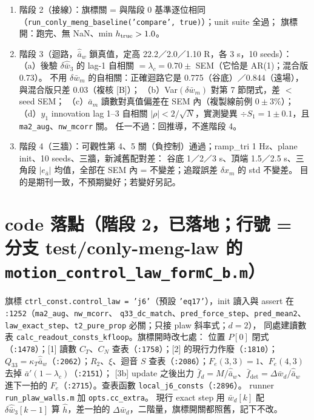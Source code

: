 \documentclass[11pt,a4paper]{ctexart}
\newcommand{\ba}{\bar{a}}
\newcommand{\bw}{\bar{w}}
\newcommand{\ap}{\ba'}
\newcommand{\ah}{\hat{\ba}_w}
\newcommand{\hh}{\hat{h}}
\newcommand{\lc}{\lambda_c}
\newcommand{\fd}{\bar{f}_d}
\newcommand{\fdet}{\bar{f}_{\det}}
\begin{document}
\begin{enumerate}
\item 階段 2（接線）：旗標關 = 與階段 0 基準逐位相同（\texttt{run\_conly\_meng\_baseline('compare', true)}）；unit suite 全過；
      旗標開：跑完、無 NaN、min $h_{\rm true} > 1.0$。
\item 階段 3（迴路，$\ah$ 鎖真值，定高 22.2／2.0／1.10 R，各 3 s，10 seeds）：
      （a）後驗 $\delta\hat{\bw}_3$ 的 lag-1 自相關 $= \lc = 0.70 \pm$ SEM（它恰是 AR(1)；混合版 0.73）。
            不用 $\delta\bw_m$ 的自相關：正確迴路它是 0.775（谷底）／0.844（遠場），與混合版只差 0.03（複核 [B]）；
      （b）Var$(\delta\bw_m)$ 對第 7 節閉式，差 $<$ seed SEM；
      （c）$\ba_m$ 讀數對真值偏差在 SEM 內（複製線前例 $0 \pm 3\%$）；
      （d）$y_1$ innovation lag 1--3 自相關 $|\rho| < 2/\sqrt{N}$，實測變異 $\div S_1 = 1 \pm 0.1$，且 \texttt{ma2\_aug}、\texttt{nw\_mcorr} 關。
      任一不過：回推導，不進階段 4。
\item 階段 4（三牆）：可觀性第 4、5 關（負控制）通過；ramp\_tri 1 Hz、plane init、10 seeds、三牆，新減舊配對差：
      谷底 1／2／3 s、頂端 1.5／2.5 s、三角段 $|e_{\ba}|$ 均值，全部在 SEM 內 = 不變差；追蹤誤差 $\delta x_m$ 的 std 不變差。
      目的是期刊一致，不預期變好；若變好另記。
\end{enumerate}

\section{code 落點（階段 2，已落地；行號 = 分支 test/conly-meng-law 的 \texttt{motion\_control\_law\_formC\_b.m}）}

旗標 \texttt{ctrl\_const.control\_law = 'j6'}（預設 \texttt{'eq17'}），init 讀入與 assert 在 \texttt{:1252}（\texttt{ma2\_aug}、\texttt{nw\_mcorr}、
\texttt{q33\_dc\_match}、\texttt{pred\_force\_step}、\texttt{pred\_mean2}、\texttt{law\_exact\_step}、\texttt{t2\_pure\_prop} 必關；只接 plaw 斜率式；$d = 2$），
同處建讀數表 \texttt{calc\_readout\_consts\_kfloop}。旗標開時改七處：
位置 $P[0]$ 閉式（\texttt{:1478}）；[1] 讀數 $C_T$、$C_N$ 查表（\texttt{:1758}）；[2] 的現行力作廢（\texttt{:1810}）；
$Q_{33} = \kappa_T\ah$（\texttt{:2062}）；$R_2$、$\xi$、迴音 $S$ 查表（\texttt{:2086}）；$F_e(3,3) = 1$、$F_e(4,3)$ 去掉 $\ap(1-\lc)$（\texttt{:2151}）；
[3b] update 之後出力 $\fd = M/\ah$、$\fdet = \Delta\bw_d/\ah$ 進下一拍的 $F_e$（\texttt{:2715}）。查表函數 \texttt{local\_j6\_consts}（\texttt{:2896}）。
runner \texttt{run\_plaw\_walls.m} 加 \texttt{opts.cc\_extra}。
現行 exact step 用 $\bw_d[k]$ 配 $\delta\hat{\bw}_3[k-1]$ 算 $\hh$，差一拍的 $\Delta\bw_d$，二階量，旗標開關都照舊，記下不改。
\end{document}
